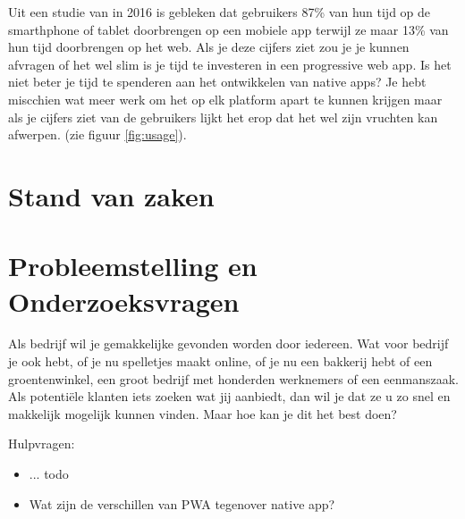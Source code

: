 Uit een studie van \textcite{comScore} in 2016 is gebleken dat gebruikers 87\% van hun tijd op de smarthphone of tablet doorbrengen op een mobiele app terwijl ze maar 13\% van hun tijd doorbrengen op het web. Als je deze cijfers ziet zou je je kunnen afvragen of het wel slim is je tijd te investeren in een progressive web app. Is het niet beter je tijd te spenderen aan het ontwikkelen van native apps? Je hebt miscchien wat meer werk om het op elk platform apart te kunnen krijgen maar als je cijfers ziet van de gebruikers lijkt het erop dat het wel zijn vruchten kan afwerpen.
(zie figuur \ref{fig:usage}).



\section{Stand van zaken}
\label{sec:stand-van-zaken}


\lipsum[7-20]

\section{Probleemstelling en Onderzoeksvragen}
\label{sec:onderzoeksvragen}


Als bedrijf wil je gemakkelijke gevonden worden door iedereen. Wat voor bedrijf je ook hebt, of je nu spelletjes maakt online, of je nu een bakkerij hebt of een groentenwinkel, een groot bedrijf met honderden werknemers of een eenmanszaak. Als potentiële klanten iets zoeken wat jij aanbiedt, dan wil je dat ze u zo snel en makkelijk mogelijk kunnen vinden. Maar hoe kan je dit het best doen? 

Hulpvragen:
\begin{itemize}  
	\item ... todo
	\item Wat zijn de verschillen van PWA tegenover native app?
\end{itemize}



